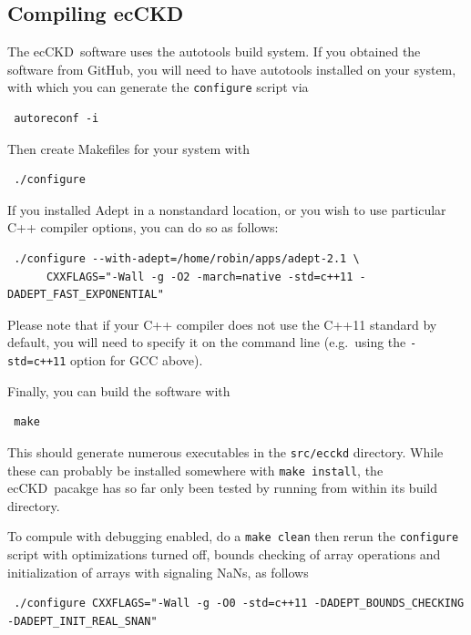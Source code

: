\documentclass[a4,oneside]{article}
\def\codesize{\small}
\newcommand{\ecckd}{ecCKD}
\def\codesize{\small}
\def\code#1{{\codesize\texttt{#1}}}
\begin{document}
\subsection{Compiling \ecckd}
The \ecckd\ software uses the autotools build system.  If you obtained
the software from GitHub, you will need to have autotools installed on
your system, with which you can generate the \code{configure} script
via
%
\begin{lstlisting}
 autoreconf -i
\end{lstlisting}
%
Then create Makefiles for your system with
%
\begin{lstlisting}
 ./configure
\end{lstlisting}
%
If you installed Adept in a nonstandard location, or you wish to use
particular C++ compiler options, you can do so as follows:
%
\begin{lstlisting}
 ./configure --with-adept=/home/robin/apps/adept-2.1 \
      CXXFLAGS="-Wall -g -O2 -march=native -std=c++11 -DADEPT_FAST_EXPONENTIAL"
\end{lstlisting}
%
Please note that if your C++ compiler does not use the C++11 standard
by default, you will need to specify it on the command line
(e.g.\ using the \code{-std=c++11} option for GCC above).

Finally, you can build the software with
\begin{lstlisting}
 make
\end{lstlisting}
%
This should generate numerous executables in the \code{src/ecckd}
directory. While these can probably be installed somewhere with
\code{make install}, the \ecckd\ pacakge has so far only been tested
by running from within its build directory.

To compule with debugging enabled, do a \code{make clean} then rerun
the \code{configure} script with optimizations turned off, bounds
checking of array operations and initialization of arrays with
signaling NaNs, as follows
%
\begin{lstlisting}
 ./configure CXXFLAGS="-Wall -g -O0 -std=c++11 -DADEPT_BOUNDS_CHECKING -DADEPT_INIT_REAL_SNAN"
\end{lstlisting}
%
\end{document}
